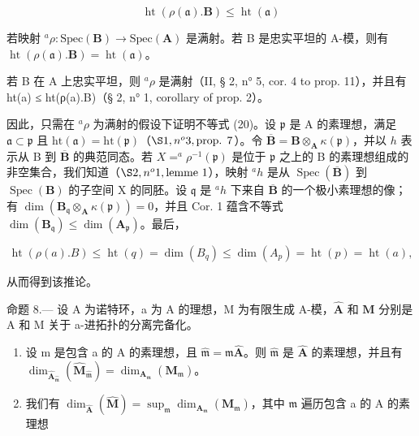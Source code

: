 \[
\operatorname{ht} (\rho (\mathfrak {a}). \mathbf {B}) \leqslant \operatorname{ht} (\mathfrak {a})\tag{20}
\]

若映射 \(^a\rho : \text{Spec}(\mathbf{B}) \to \text{Spec}(\mathbf{A})\) 是满射。若 B 是忠实平坦的 A-模，则有 \(\operatorname{ht}(\rho(\mathfrak{a}).\mathbf{B}) = \operatorname{ht}(\mathfrak{a})\)。

若 B 在 A 上忠实平坦，则 \(^{a}\rho\) 是满射（II, § 2, n° 5, cor. 4 to prop. 11），并且有 ht(a) ≤ ht(ρ(a).B)（§ 2, n° 1, corollary of prop. 2）。

因此，只需在 \(^a\rho\) 为满射的假设下证明不等式 (20)。设 \(\mathfrak{p}\) 是 A 的素理想，满足 \(\mathfrak{a} \subset \mathfrak{p}\) 且 \(\mathrm{ht}(\mathfrak{a}) = \mathrm{ht}(\mathfrak{p})\)（\(\S 1, n^o 3, \text{prop. } 7\)）。令 \(\overline{\mathbf{B}} = \mathbf{B} \otimes_{\mathbf{A}} \kappa(\mathfrak{p})\)，并以 \(h\) 表示从 B 到 \(\overline{\mathbf{B}}\) 的典范同态。若 \(X = ^a\rho^{-1}(\mathfrak{p})\) 是位于 \(\mathfrak{p}\) 之上的 B 的素理想组成的非空集合，我们知道（\(\S 2, n^o 1, \text{lemme 1}\)），映射 \(^ah\) 是从 \(\operatorname{Spec}(\overline{\mathbf{B}})\) 到 \(\operatorname{Spec}(\mathbf{B})\) 的子空间 X 的同胚。设 \(\mathfrak{q}\) 是 \(^ah\) 下来自 \(\overline{\mathbf{B}}\) 的一个极小素理想的像；有 \(\dim(\mathbf{B}_{\mathfrak{q}} \otimes_{\mathbf{A}} \kappa(\mathfrak{p})) = 0\)，并且 Cor. 1 蕴含不等式 \(\dim(\mathbf{B}_{\mathfrak{q}}) \leqslant \dim(\mathbf{A}_{\mathfrak{p}})\)。最后，

\[
\operatorname{ht} (\rho (a). B) \leqslant \operatorname{ht} (q) = \dim (B _ {q}) \leqslant \dim (A _ {p}) = \operatorname{ht} (p) = \operatorname{ht} (a),
\]

从而得到该推论。

命题 8.--- 设 A 为诺特环，a 为 A 的理想，M 为有限生成 A-模，\(\hat{\mathbf{A}}\) 和 \(\hat{\mathbf{M}}\) 分别是 A 和 M 关于 a-进拓扑的分离完备化。

\begin{enumerate}
\def\labelenumi{\alph{enumi})}
\item
  设 m 是包含 a 的 A 的素理想，且 \(\hat{\mathfrak{m}} = \mathfrak{m}\hat{\mathbf{A}}\)。则 \(\hat{\mathfrak{m}}\) 是 \(\hat{\mathbf{A}}\) 的素理想，并且有 \(\dim_{\hat{\mathbf{A}}_{\hat{\mathfrak{m}}}}(\hat{\mathbf{M}}_{\hat{\mathfrak{m}}}) = \dim_{\mathbf{A}_{\mathfrak{m}}}(\mathbf{M}_{\mathfrak{m}})\)。
\item
  我们有 \(\dim_{\hat{\mathbf{A}}}(\hat{\mathbf{M}}) = \sup_{\mathfrak{m}} \dim_{\mathbf{A}_{\mathfrak{m}}}(\mathbf{M}_{\mathfrak{m}})\)，其中 \(\mathfrak{m}\) 遍历包含 a 的 A 的素理想
\end{enumerate}


